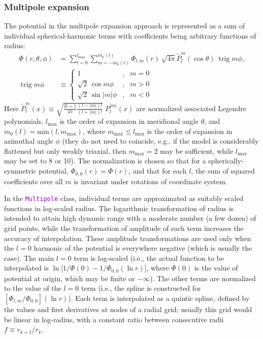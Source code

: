 \documentclass[12pt]{article}
\newcommand{\ttt}[1]{\textcolor{darkviolet}{\texttt{#1}}}
\DeclareMathOperator{\trig}{trig}
\begin{document}

\subsubsection{Multipole expansion}  \label{sec:PotentialMultipoleDetails}

The potential in the multipole expansion approach is represented as a sum of individual spherical-harmonic terms with coefficients being arbitrary functions of radius:
\begin{align}
\Phi(r,\theta,\phi) &= \sum_{l=0}^{l_\mathrm{max}}\sum_{m=-m_0(l)}^{m_0(l)}
\Phi_{l,m}(r)\: \sqrt{4\pi} \tilde P_l^m(\cos\theta)\:\trig m\phi, \\
\trig m\phi &\equiv \left\{\begin{array}{rcl} 
  1 &,& m=0 \\
  \sqrt{2}\,\cos  m \phi &,& m > 0 \\
  \sqrt{2}\,\sin |m|\phi &,& m < 0 
\end{array}\right.   \nonumber
\end{align}
Here $\tilde P_l^m(x) \equiv \sqrt{\frac{2l+1}{4\pi}\frac{(l-|m|)!}{(l+|m|)!}} \;P_l^{|m|}(x)$ 
are normalized associated Legendre polynomials, $l_\mathrm{max}$ is the order of expansion in meridional angle $\theta$, and $m_0(l) = \mathrm{min}(l, m_\mathrm{max})$, where $m_\mathrm{max} \le l_\mathrm{max}$ is the order of expansion in azimuthal angle $\phi$ (they do not need to coincide, e.g., if the model is considerably flattened but only weakly triaxial, then $m_\mathrm{max}=2$ may be sufficient, while $l_\mathrm{max}$ may be set to 8 or 10). The normalization is chosen so that for a spherically-symmetric potential, $\Phi_{0,0}(r)=\Phi(r)$, and that for each $l$, the sum of squared coefficients over all $m$ is invariant under rotations of coordinate system.

In the \ttt{Multipole} class, individual terms are approximated as suitably scaled functions in log-scaled radius. The logarithmic transformation of radius is intended to attain high dynamic range with a moderate number (a few dozen) of grid points, while the transformation of amplitude of each term increases the accuracy of interpolation. These amplitude transformations are used only when the $l=0$ harmonic of the potential is everywhere negative (which is usually the case). The main $l=0$ term is log-scaled (i.e., the actual function to be interpolated is $\ln\big[1/\Phi(0)-1/\Phi_{0,0}(\ln r)\big]$, where $\Phi(0)$ is the value of potential at origin, which may be finite or $-\infty$). The other terms are normalized to the value of the $l=0$ term (i.e., the spline is constructed for $[\Phi_{l,m}/\Phi_{0,0}](\ln r)$). Each term is interpolated as a quintic spline, defined by the values and first derivatives at nodes of a radial grid; usually this grid would be linear in log-radius, with a constant ratio between consecutive radii $f\equiv r_{k+1}/r_k$.
\end{document}
